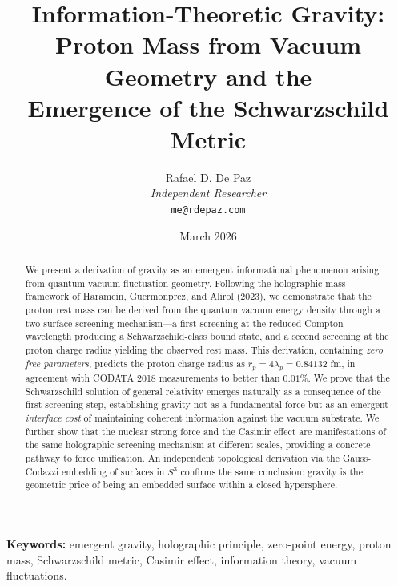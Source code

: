 \documentclass[12pt, a4paper]{article}
\theoremstyle{plain}
\theoremstyle{definition}
\theoremstyle{remark}
\newcommand{\rp}{r_p}
\begin{document}
\title{
  \textbf{Information-Theoretic Gravity: \\
  Proton Mass from Vacuum Geometry and the \\
  Emergence of the Schwarzschild Metric}
}
\author{
  Rafael D. De Paz \\
  \textit{Independent Researcher} \\
  \texttt{me@rdepaz.com}
}
\date{March 2026}
\maketitle

\begin{abstract}
We present a derivation of gravity as an emergent informational phenomenon
arising from quantum vacuum fluctuation geometry. Following the holographic
mass framework of Haramein, Guermonprez, and Alirol (2023), we demonstrate
that the proton rest mass can be derived from the quantum vacuum energy density
through a two-surface screening mechanism---a first screening at the reduced
Compton wavelength producing a Schwarzschild-class bound state, and a second
screening at the proton charge radius yielding the observed rest mass.
This derivation, containing \emph{zero free parameters}, predicts the proton
charge radius as $\rp = 4\lambda_p = 0.84132$ fm, in agreement with CODATA
2018 measurements to better than $0.01\%$. We prove that the Schwarzschild
solution of general relativity emerges naturally as a consequence of the first
screening step, establishing gravity not as a fundamental force but as an
emergent \emph{interface cost} of maintaining coherent information against the
vacuum substrate. We further show that the nuclear strong force and the Casimir
effect are manifestations of the same holographic screening mechanism at
different scales, providing a concrete pathway to force unification. An
independent topological derivation via the Gauss-Codazzi embedding of surfaces
in $S^3$ confirms the same conclusion: gravity is the geometric price of being
an embedded surface within a closed hypersphere.
\end{abstract}

\vspace{1em}
\noindent\textbf{Keywords:} emergent gravity, holographic principle,
zero-point energy, proton mass, Schwarzschild metric, Casimir effect,
information theory, vacuum fluctuations.
\end{document}
